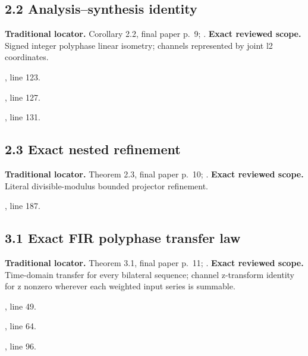 \subsection{2.2 Analysis–synthesis identity}
\label{result:2.2}
\textbf{Traditional locator.} Corollary 2.2, final paper p.~9; .
\textbf{Exact reviewed scope.} Signed integer polyphase linear isometry; channels represented by joint l2 coordinates.
{\small{}\par}
{\footnotesize\color{muted}, line 123.\par}\smallskip
{\small{}\par}
{\footnotesize\color{muted}, line 127.\par}\smallskip
{\small{}\par}
{\footnotesize\color{muted}, line 131.\par}\smallskip
{}
\subsection{2.3 Exact nested refinement}
\label{result:2.3}
\textbf{Traditional locator.} Theorem 2.3, final paper p.~10; .
\textbf{Exact reviewed scope.} Literal divisible-modulus bounded projector refinement.
{\small{}\par}
{\footnotesize\color{muted}, line 187.\par}\smallskip
{}
\subsection{3.1 Exact FIR polyphase transfer law}
\label{result:3.1}
\textbf{Traditional locator.} Theorem 3.1, final paper p.~11; .
\textbf{Exact reviewed scope.} Time-domain transfer for every bilateral sequence; channel z-transform identity for z nonzero wherever each weighted input series is summable.
{\small{}\par}
{\footnotesize\color{muted}, line 49.\par}\smallskip
{\small{}\par}
{\footnotesize\color{muted}, line 64.\par}\smallskip
{\small{}\par}
{\footnotesize\color{muted}, line 96.\par}\smallskip
{}
